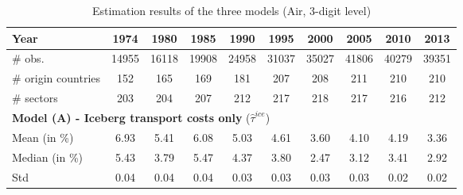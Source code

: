 \documentclass[11pt,twoside, authoryear]{elsarticle}
\begin{document}
\begin{table}[htbp]
  \centering
   \footnotesize{
    \caption{Estimation results of the three models (Air, 3-digit level)}
  \label{tab:3models_estimation_results_air}%
    \begin{tabular}{l|c c c c c c c c c}
    \hline \hline
    \textbf{Year} & \multicolumn{1}{c}{\textbf{1974}} & \multicolumn{1}{c}{\textbf{1980}} & \multicolumn{1}{c}{\textbf{1985}} & \multicolumn{1}{c}{\textbf{1990}} & \multicolumn{1}{c}{\textbf{1995}} & \multicolumn{1}{c}{\textbf{2000}} & \multicolumn{1}{c}{\textbf{2005}} & \multicolumn{1}{c}{\textbf{2010}} & \multicolumn{1}{c}{\textbf{2013}} \\ \hline
   $\#$ obs. & \multicolumn{1}{c}{14955} & \multicolumn{1}{c}{16118} & \multicolumn{1}{c}{19908} & \multicolumn{1}{c}{24958} & \multicolumn{1}{c}{31037} & \multicolumn{1}{c}{35027} & \multicolumn{1}{c}{41806} & \multicolumn{1}{c}{40279} & \multicolumn{1}{c}{39351} \\
   $\#$  origin countries & \multicolumn{1}{c}{152} & \multicolumn{1}{c}{165} & \multicolumn{1}{c}{169} & \multicolumn{1}{c}{181} & \multicolumn{1}{c}{207} & \multicolumn{1}{c}{208} & \multicolumn{1}{c}{211} & \multicolumn{1}{c}{210} & \multicolumn{1}{c}{210} \\
   $\#$  sectors & \multicolumn{1}{c}{203} & \multicolumn{1}{c}{204} & \multicolumn{1}{c}{207} & \multicolumn{1}{c}{212} & \multicolumn{1}{c}{217} & \multicolumn{1}{c}{218} & \multicolumn{1}{c}{217} & \multicolumn{1}{c}{216} & \multicolumn{1}{c}{212} \\ \hline
    \multicolumn{10}{l}{\textbf{Model (A) - Iceberg transport costs only} ($\widehat{\tau}^{ice}$)} \\ \hline
    Mean (in \%) & \multicolumn{1}{c}{6.93} & \multicolumn{1}{c}{5.41} & \multicolumn{1}{c}{6.08} & \multicolumn{1}{c}{5.03} & \multicolumn{1}{c}{4.61} & \multicolumn{1}{c}{3.60} & \multicolumn{1}{c}{4.10} & \multicolumn{1}{c}{4.19} & \multicolumn{1}{c}{3.36} \\
    Median (in \%)& \multicolumn{1}{c}{5.43} & \multicolumn{1}{c}{3.79} & \multicolumn{1}{c}{5.47} & \multicolumn{1}{c}{4.37} & \multicolumn{1}{c}{3.80} & \multicolumn{1}{c}{2.47} & \multicolumn{1}{c}{3.12} & \multicolumn{1}{c}{3.41} & \multicolumn{1}{c}{2.92} \\
    Std & \multicolumn{1}{c}{0.04} & \multicolumn{1}{c}{0.04} & \multicolumn{1}{c}{0.04} & \multicolumn{1}{c}{0.03} & \multicolumn{1}{c}{0.03} & \multicolumn{1}{c}{0.03} & \multicolumn{1}{c}{0.03} & \multicolumn{1}{c}{0.02} & \multicolumn{1}{c}{0.02} \\ \hline

\end{tabular}}
\end{table}
\end{document}
